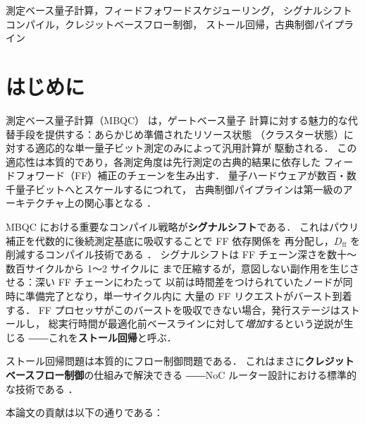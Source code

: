 \documentclass[journal,10pt,twocolumn]{IEEEtran}
\begin{document}
\begin{IEEEkeywords}
測定ベース量子計算，フィードフォワードスケジューリング，
シグナルシフトコンパイル，クレジットベースフロー制御，
ストール回帰，古典制御パイプライン
\end{IEEEkeywords}

\section{はじめに}

測定ベース量子計算（MBQC）\cite{RaussendorfBriegel2001} は，ゲートベース量子
計算に対する魅力的な代替手段を提供する：あらかじめ準備されたリソース状態
（クラスター状態）に対する適応的な単一量子ビット測定のみによって汎用計算が
駆動される．
この適応性は本質的であり，各測定角度は先行測定の古典的結果に依存した
フィードフォワード（FF）補正のチェーンを生み出す．
量子ハードウェアが数百・数千量子ビットへとスケールするにつれて，
古典制御パイプラインは第一級のアーキテクチャ上の関心事となる
\cite{RaussendorfHarrington2007,FowlerMartinis2012}．

MBQC における重要なコンパイル戦略が\textbf{シグナルシフト}である．
これはパウリ補正を代数的に後続測定基底に吸収することで FF 依存関係を
再分配し，$D_{\mathrm{ff}}$ を削減するコンパイル技術である
\cite{DanosKashefi2006,Broadbent2009}．
シグナルシフトは FF チェーン深さを数十〜数百サイクルから 1〜2 サイクルに
まで圧縮するが，意図しない副作用を生じさせる：深い FF チェーンにわたって
以前は時間差をつけられていたノードが同時に準備完了となり，単一サイクル内に
大量の FF リクエストがバースト到着する．
FF プロセッサがこのバーストを吸収できない場合，発行ステージはストールし，
総実行時間が最適化前ベースラインに対して\textit{増加}するという逆説が生じる
――これを\textbf{ストール回帰}と呼ぶ．

ストール回帰問題は本質的にフロー制御問題である．
これはまさに\textbf{クレジットベースフロー制御}の仕組みで解決できる
――NoC ルーター設計における標準的な技術である \cite{DallyTowles2004}．

本論文の貢献は以下の通りである：
\end{document}
